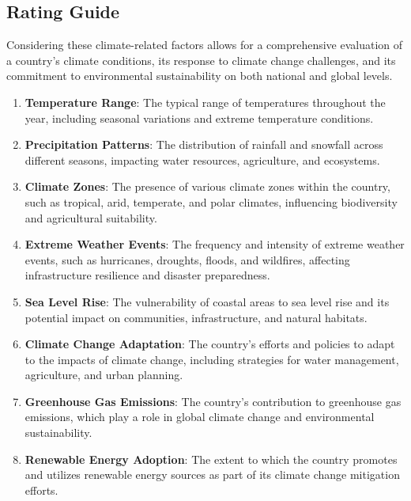 \subsection{Rating Guide}
Considering these climate-related factors allows for a
comprehensive evaluation of a country's climate conditions,
its response to climate change challenges, and its
commitment to environmental sustainability on both national
and global levels.
\begin{enumerate}
  \item \textbf{Temperature Range}: The typical range of
  temperatures throughout the year, including seasonal
  variations and extreme temperature conditions.
  
  \item \textbf{Precipitation Patterns}: The distribution of
  rainfall and snowfall across different seasons, impacting
  water resources, agriculture, and ecosystems.
  
  \item \textbf{Climate Zones}: The presence of various climate
  zones within the country, such as tropical, arid, temperate,
  and polar climates, influencing biodiversity and agricultural
  suitability.
  
  \item \textbf{Extreme Weather Events}: The frequency and intensity
  of extreme weather events, such as hurricanes, droughts, floods,
  and wildfires, affecting infrastructure resilience and disaster
  preparedness.
  
  \item \textbf{Sea Level Rise}: The vulnerability of coastal areas
  to sea level rise and its potential impact on communities,
  infrastructure, and natural habitats.
  
  \item \textbf{Climate Change Adaptation}: The country's efforts
  and policies to adapt to the impacts of climate change, including
  strategies for water management, agriculture, and urban planning.
  
  \item \textbf{Greenhouse Gas Emissions}: The country's contribution
  to greenhouse gas emissions, which play a role in global climate
  change and environmental sustainability.
  
  \item \textbf{Renewable Energy Adoption}: The extent to which the
  country promotes and utilizes renewable energy sources as part of
  its climate change mitigation efforts.
  

\end{enumerate}
